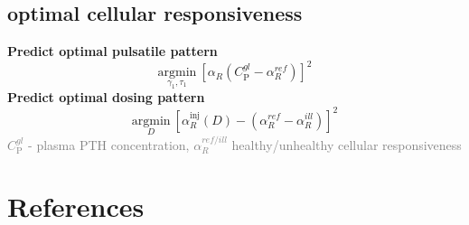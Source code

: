 \documentclass[%
aspectratio=169,  %
]{beamer}
\begin{document}
\subsection{optimal cellular responsiveness}
\begin{frame}
\textbf{Predict optimal pulsatile pattern}
\begin{equation}
	\underset{\gamma_1, \tau_1}{\text{argmin}} ~ [\alpha_R(C_\text{P}^{gl} - \alpha_R^{ref})]^2
\end{equation}
\textbf{Predict optimal dosing pattern}
\begin{equation}
	\underset{D}{\text{argmin}} ~ [\alpha_R^\text{inj}(D) -( \alpha_R^{ref}-\alpha_R^{ill})]^2
\end{equation}
\textcolor{gray}{$C_\text{P}^{gl}$ - plasma PTH concentration, $\alpha_R^{ref/ill}$ healthy/unhealthy cellular responsiveness}
\end{frame}

\section*{References}%
\begin{frame}[allowframebreaks]

   
\end{frame}
\end{document}
